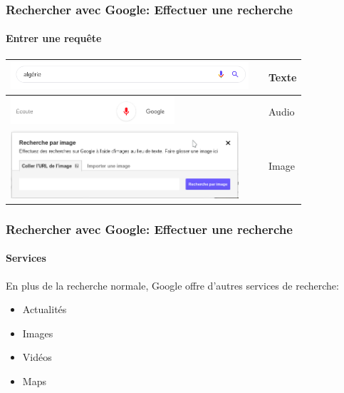 \documentclass{beamer}
\begin{document}
\begin{frame}
\frametitle{Rechercher avec Google: Effectuer une recherche}
\framesubtitle{Entrer une requête}
\begin{tabular}{p{}cp{}}
	
	\hline
	
	 \includegraphics[height=1cm]{..//img/Bweb02-ri-gmail/google-input-text.png} &
	& 
	Texte  \\
	
	\hline
	
	\includegraphics[height=1cm]{..//img/Bweb02-ri-gmail/google-input-audio.png} &
	& 
	Audio \\
	
	\hline
	
	\includegraphics[height=2.5cm]{..//img/Bweb02-ri-gmail/google-input-image.png} & 
	& 
	Image \\
	
	\hline

\end{tabular}

\end{frame}

\begin{frame}
\frametitle{Rechercher avec Google: Effectuer une recherche}
\framesubtitle{Services}

En plus de la recherche normale, Google offre d'autres services de recherche: 
\begin{itemize}
	\item Actualités
	\item Images
	\item Vidéos
	\item Maps
\end{itemize}

\end{frame}
\end{document}
